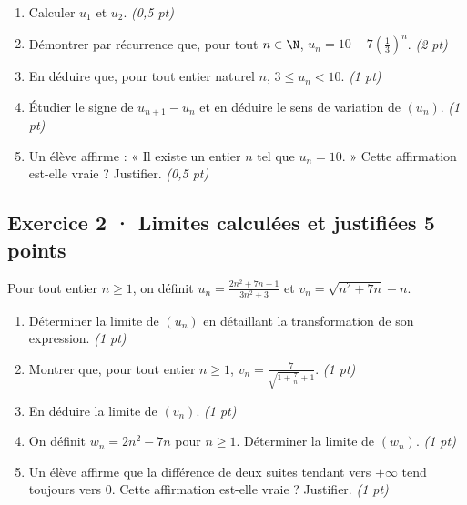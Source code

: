 \begin{enumerate}

\item Calculer $u_1$ et $u_2$. \hfill\textit{(0{,}5 pt)}

\item Démontrer par récurrence que, pour tout $n\in\N$, $u_n=10-7\left(\frac{1}{3}\right)^n$. \hfill\textit{(2 pt)}

\item En déduire que, pour tout entier naturel $n$, $3\le u_n<10$. \hfill\textit{(1 pt)}

\item Étudier le signe de $u_{n+1}-u_n$ et en déduire le sens de variation de $(u_n)$. \hfill\textit{(1 pt)}

\item Un élève affirme : « Il existe un entier $n$ tel que $u_n=10$. » Cette affirmation est-elle vraie ? Justifier. \hfill\textit{(0{,}5 pt)}

\end{enumerate}

\subsection*{Exercice 2 · Limites calculées et justifiées \hfill 5 points}Pour tout entier $n\ge1$, on définit $u_n=\frac{2n^2+7n-1}{3n^2+3}$ et $v_n=\sqrt{n^2+7n}-n$.

\begin{enumerate}

\item Déterminer la limite de $(u_n)$ en détaillant la transformation de son expression. \hfill\textit{(1 pt)}

\item Montrer que, pour tout entier $n\ge1$, $v_n=\frac{7}{\sqrt{1+\frac{7}n}+1}$. \hfill\textit{(1 pt)}

\item En déduire la limite de $(v_n)$. \hfill\textit{(1 pt)}

\item On définit $w_n=2n^2-7n$ pour $n\ge1$. Déterminer la limite de $(w_n)$. \hfill\textit{(1 pt)}

\item Un élève affirme que la différence de deux suites tendant vers $+\infty$ tend toujours vers $0$. Cette affirmation est-elle vraie ? Justifier. \hfill\textit{(1 pt)}

\end{enumerate}

